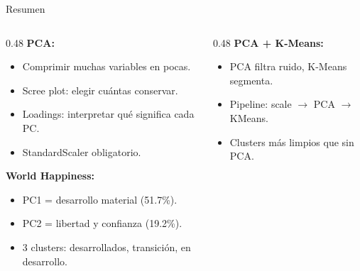 \documentclass[aspectratio=169, 11pt]{beamer}
\begin{document}
\begin{frame}[shrink=10]{Resumen}
  \vspace{-4pt}
  \begin{columns}[T]
    \begin{column}{0.48\textwidth}
      {\footnotesize\bfseries\color{arcaDark} PCA:}
      \vspace{4pt}

      {\footnotesize
      \begin{itemize}\setlength{\itemsep}{3pt}
        \item[{\color{codeGreen}\faCheckCircle}]
          Comprimir muchas variables en pocas.
        \item[{\color{codeGreen}\faCheckCircle}]
          Scree plot: elegir cu\'antas conservar.
        \item[{\color{codeGreen}\faCheckCircle}]
          Loadings: interpretar qu\'e significa cada PC.
        \item[{\color{codeGreen}\faCheckCircle}]
          StandardScaler obligatorio.
      \end{itemize}
      }

      \vspace{4pt}
      {\footnotesize\bfseries\color{codeBlue} World Happiness:}
      \vspace{4pt}

      {\footnotesize
      \begin{itemize}\setlength{\itemsep}{3pt}
        \item[{\color{codeGreen}\faCheckCircle}]
          PC1 = desarrollo material (51.7\%).
        \item[{\color{codeGreen}\faCheckCircle}]
          PC2 = libertad y confianza (19.2\%).
        \item[{\color{codeGreen}\faCheckCircle}]
          3 clusters: desarrollados, transici\'on, en desarrollo.
      \end{itemize}
      }
    \end{column}

    \begin{column}{0.48\textwidth}
      {\footnotesize\bfseries\color{arcaRed} PCA + K-Means:}
      \vspace{4pt}

      {\footnotesize
      \begin{itemize}\setlength{\itemsep}{3pt}
        \item[{\color{codeGreen}\faCheckCircle}]
          PCA filtra ruido, K-Means segmenta.
        \item[{\color{codeGreen}\faCheckCircle}]
          Pipeline: scale $\to$ PCA $\to$ KMeans.
        \item[{\color{codeGreen}\faCheckCircle}]
          Clusters m\'as limpios que sin PCA.
      \end{itemize}
      }


\end{column}
\end{columns}
\end{frame}
\end{document}
